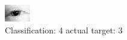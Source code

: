 \begin{figure}[h!]
\begin{center}
\includegraphics[width=0.60\columnwidth]{figures/ID139_class_4_target_3.png}
\end{center}
\caption{ Classification: 4 actual target: 3}
\label{fig:ID139_class_4_target_3}
\end{figure}
